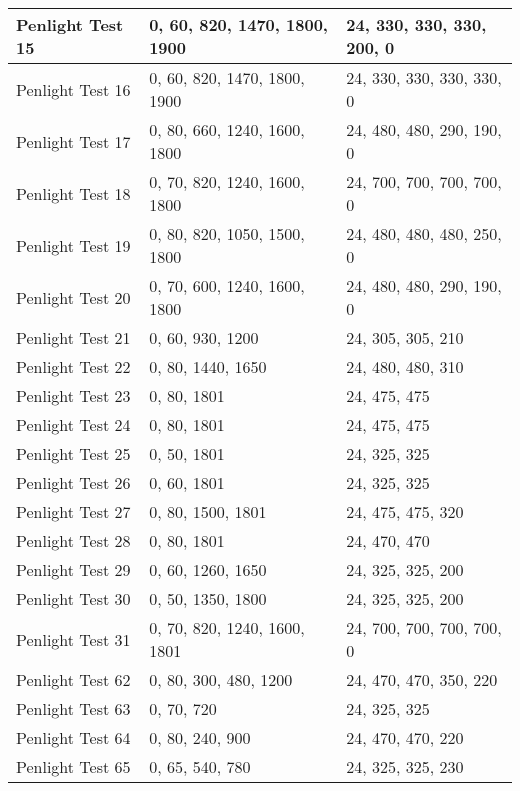 \begin{table}[!ht]
\begin{center}
\begin{tabular}{|l|l|l|}
Penlight Test 15  &  0, 60, 820, 1470, 1800, 1900  &  24, 330, 330, 330, 200, 0  \\ \hline
Penlight Test 16  &  0, 60, 820, 1470, 1800, 1900  &  24, 330, 330, 330, 330, 0  \\ \hline
Penlight Test 17  &  0, 80, 660, 1240, 1600, 1800  &  24, 480, 480, 290, 190, 0  \\ \hline
Penlight Test 18  &  0, 70, 820, 1240, 1600, 1800  &  24, 700, 700, 700, 700, 0  \\ \hline
Penlight Test 19  &  0, 80, 820, 1050, 1500, 1800  &  24, 480, 480, 480, 250, 0  \\ \hline
Penlight Test 20  &  0, 70, 600, 1240, 1600, 1800  &  24, 480, 480, 290, 190, 0  \\ \hline
Penlight Test 21  &  0, 60, 930, 1200              &  24, 305, 305, 210          \\ \hline
Penlight Test 22  &  0, 80, 1440, 1650             &  24, 480, 480, 310          \\ \hline
Penlight Test 23  &  0, 80, 1801                   &  24, 475, 475               \\ \hline
Penlight Test 24  &  0, 80, 1801                   &  24, 475, 475               \\ \hline
Penlight Test 25  &  0, 50, 1801                   &  24, 325, 325               \\ \hline
Penlight Test 26  &  0, 60, 1801                   &  24, 325, 325               \\ \hline
Penlight Test 27  &  0, 80, 1500, 1801             &  24, 475, 475, 320          \\ \hline
Penlight Test 28  &  0, 80, 1801                   &  24, 470, 470               \\ \hline
Penlight Test 29  &  0, 60, 1260, 1650             &  24, 325, 325, 200          \\ \hline
Penlight Test 30  &  0, 50, 1350, 1800             &  24, 325, 325, 200          \\ \hline
Penlight Test 31  &  0, 70, 820, 1240, 1600, 1801  &  24, 700, 700, 700, 700, 0  \\ \hline
Penlight Test 62  &  0, 80, 300, 480, 1200         &  24, 470, 470, 350, 220     \\ \hline
Penlight Test 63  &  0, 70, 720                    &  24, 325, 325               \\ \hline
Penlight Test 64  &  0, 80, 240, 900               &  24, 470, 470, 220          \\ \hline
Penlight Test 65  &  0, 65, 540, 780               &  24, 325, 325, 230          \\ \hline
\end{tabular}
\end{center}
\end{table}


